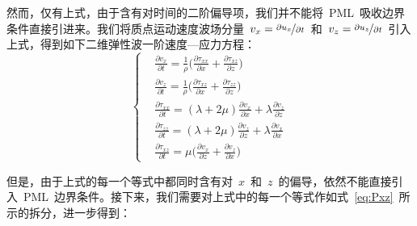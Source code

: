 \documentclass[UTF8]{ctexart}
\begin{document}
然而，仅有上式，由于含有对时间的二阶偏导项，我们并不能将~PML~吸收边界条件直接引进来。我们将质点运动速度波场分量~$v_x=\nicefrac{\partial u_x}{\partial t}$~和~$v_z=\nicefrac{\partial u_z}{\partial t}$~引入上式，得到如下二维弹性波一阶速度—应力方程：
\begin{equation}
\left\{ \begin{aligned}
& \frac{\partial v_x}{\partial t}=\frac{1}{\rho}\big(\frac{\partial \tau_{xx}}{\partial x}+\frac{\partial \tau_{xz}}{\partial z}\big) \\
& \frac{\partial v_z}{\partial t}=\frac{1}{\rho}\big(\frac{\partial \tau_{xz}}{\partial x}+\frac{\partial \tau_{zz}}{\partial z}\big) \\
& \frac{\partial \tau_{xx}}{\partial t}=(\lambda+2\mu)\frac{\partial v_x}{\partial x}+\lambda\frac{\partial v_z}{\partial z} \\
& \frac{\partial \tau_{zz}}{\partial t}=(\lambda+2\mu)\frac{\partial v_z}{\partial z}+\lambda\frac{\partial v_x}{\partial x} \\
& \frac{\partial \tau_{xz}}{\partial t}=\mu\big(\frac{\partial v_x}{\partial z}+\frac{\partial v_z}{\partial x} \big)
\end{aligned} \right.
\end{equation}\par
但是，由于上式的每一个等式中都同时含有对~$x$~和~$z$~的偏导，依然不能直接引入~PML~边界条件。接下来，我们需要对上式中的每一个等式作如式~\eqref{eq:Pxz}~所示的拆分，进一步得到：
\end{document}
